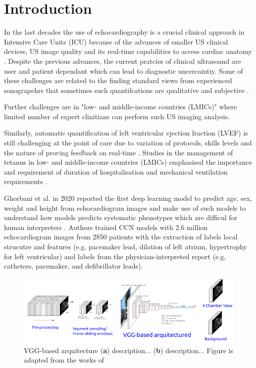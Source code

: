 \section{Introduction} \label{sec:intro}
In the last decades the use of echocardiography is a crucial clinical approach in Intensive Care Units (ICU) because of the advances of smaller US clinical devices, US image quality and its real-time capabilities to access cardiac anatomy \cite{Feigenbaum1996, Vieillard-Baron2008, singh2007, cambell2018}.
Despite the previous advances, the current pratcies of clinical ultrasound are user and patient dependant which can lead to diagnostic uncercaintiy.
Some of these challenges are related to the finding standard views from experienced sonograpehrs that sometimes such quantifcations are qualitative and subjective \cite{Feigenbaum1996}.

Further challenges are in "low- and middle-income countries (LMICs)" where limited number of expert clinitians can perform such US imaging analysis.

Similarly, automatic quantification of left ventricular ejection fraction (LVEF) is still challenging at the point of care due to variation of protocols, skills levels \cite{field2011} and the nature of proving feedback on real-time \cite{liu2021}.
Studies in the management of tetanus in low- and middle-income countries (LMICs) emphasised the importance and requirement of duration of hospitalisation and mechanical ventilation requirements \cite{hao2021-wellcome}.

Ghorbani et al. in 2020 reported the first deep learning model to predict age, sex, weight and height from echocardiogram images and make use of such models to understand how models predicts systematic phenotypes which are difficul for human interpreters \cite{Ghorbani-DigitalMedicineNature-JAN2020}.
Authors trained CCN models with 2.6 million echocardiogram images from 2850 patients with the extraction of labels local strucutre and features (e.g. pacemaker lead, dilation of left atrium, hypertrophy for left ventricular) and labels from the physician-interpreted report (e.g, catheters, pacemaker, and deﬁbrillator leads). 



\begin{figure}[h]
\centerline{
\includegraphics[width=\columnwidth]{../figures/VGG-based-arquitecture/versions/drawing-v00}
}
\caption{
	VGG-based arquitecture
	(\textbf{a}) description...
	(\textbf{b}) description...
	Figure is adapted from the works of %
}
\end{figure}


